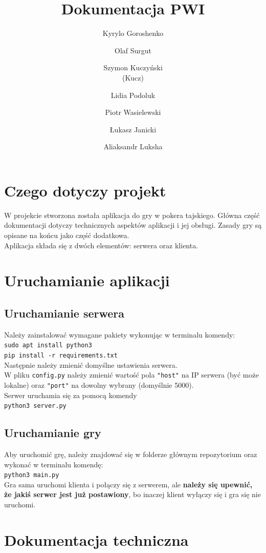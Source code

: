 \documentclass{article}
\title{Dokumentacja PWI}
\author{Kyrylo Goroshenko \and 
Olaf Surgut\\
\and 
Szymon Kuczyński\\
(Kucz) 
\and
Lidia Podoluk
\and
Piotr Wasielewski
\and
Łukasz Janicki\\
\and
Aliaksandr Luksha
}
\begin{document}
\maketitle
\section{Czego dotyczy projekt}

W projekcie stworzona została aplikacja do gry w pokera tajskiego. Główna część dokumentacji dotyczy technicznych aspektów aplikacji i jej obsługi. Zasady gry są opisane na końcu jako część dodatkowa.\\
Aplikacja składa się z dwóch elementów: serwera oraz klienta.

\section{Uruchamianie aplikacji}
\subsection{Uruchamianie serwera}
Należy zainstalować wymagane pakiety wykonując w terminalu komendy:\\
\texttt{sudo apt install python3}\\
\texttt{pip install -r requirements.txt}\\
Następnie należy zmienić domyślne ustawienia serwera.\\
W pliku \texttt{config.py} należy zmienić wartość pola \texttt{"host"} na IP serwera (być może lokalne) oraz \texttt{"port"} na dowolny wybrany (domyślnie 5000).\\
Serwer uruchamia się za pomocą komendy\\
\texttt{python3 server.py}\\

\subsection{Uruchamianie gry}
Aby uruchomić grę, należy znajdować się w folderze głównym repozytorium oraz wykonać w terminalu komendę:\\
\texttt{python3 main.py}\\
Gra sama uruchomi klienta i połączy się z serwerem, ale \textbf{należy się upewnić, że jakiś serwer jest już postawiony}, bo inaczej klient wyłączy się i gra się nie uruchomi.

\section{Dokumentacja techniczna}
\end{document}
